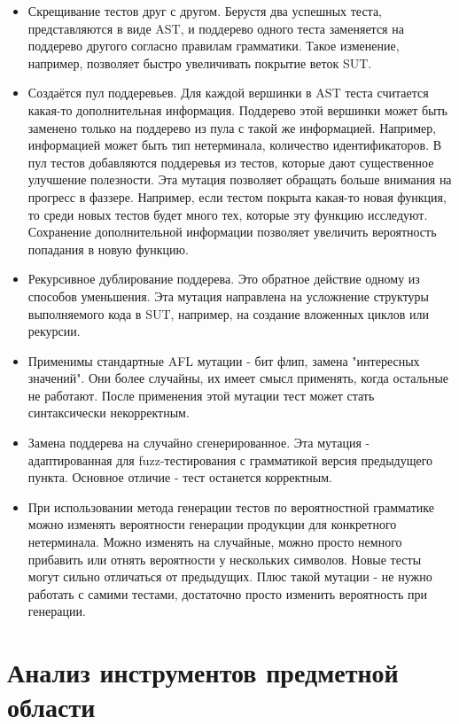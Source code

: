 \documentclass[a4paper]{article}
\begin{document}
\begin{itemize}
\item Скрещивание тестов друг с другом. Берустя два успешных теста, представляются в виде AST, и поддерево одного теста заменяется на поддерево другого согласно правилам грамматики. Такое изменение, например, позволяет быстро увеличивать покрытие веток SUT.   
\item Создаётся пул поддеревьев. Для каждой вершинки в AST теста считается  какая-то дополнительная информация. Поддерево этой вершинки может быть заменено только на поддерево из пула с такой же информацией. Например, информацией может быть тип нетерминала, количество идентификаторов. В пул тестов добавляются поддеревья из тестов, которые дают существенное улучшение полезности. Эта мутация позволяет обращать больше внимания на прогресс в фаззере. Например, если тестом покрыта какая-то новая функция, то среди новых тестов будет много тех, которые эту функцию исследуют. Сохранение дополнительной информации позволяет увеличить вероятность попадания в новую функцию.
\item Рекурсивное дублирование поддерева. Это обратное действие одному из способов уменьшения. Эта мутация направлена на усложнение структуры выполняемого кода в SUT, например, на создание вложенных циклов или рекурсии. 
\item Применимы стандартные AFL мутации - бит флип, замена "интересных значений". Они более случайны, их имеет смысл применять, когда остальные не работают. После применения этой мутации тест может стать синтаксически некорректным.
\item Замена поддерева на случайно сгенерированное. Эта мутация - адаптированная для fuzz-тестирования с грамматикой версия предыдущего пункта. Основное отличие - тест останется корректным.
\item При использовании метода генерации тестов по вероятностной грамматике можно изменять вероятности генерации продукции для конкретного нетерминала. Можно изменять на случайные, можно просто немного прибавить или отнять вероятности у нескольких символов. Новые тесты могут сильно отличаться от предыдущих. Плюс такой мутации - не нужно работать с самими тестами, достаточно просто изменить вероятность при генерации.  
\end{itemize}


\newpage
\section{Анализ инструментов предметной области}
\indent
\end{document}
